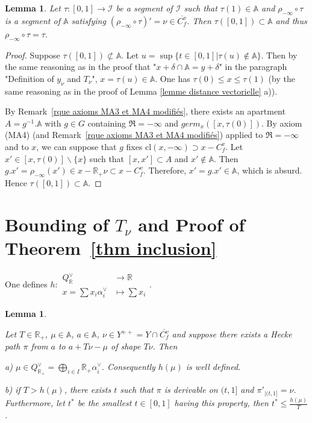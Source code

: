 \documentclass[12pt]{article}
\theoremstyle{plain}
\newtheorem{lemma}[theorem]{Lemma}
\theoremstyle{definition}
\newcommand{\R}{\mathbb{R}}
\newcommand{\A}{\mathbb{A}}
\begin{document}
\begin{lemma}\label{lemme image réciproque de segments}
Let $\tau:[0,1]\rightarrow \mathcal{I}$ be a segment of $\mathcal{I}$ such that $\tau(1)\in \mathbb{A}$ and $\rho_{-\infty}\circ\tau$ is a segment of $\mathbb{A}$ satisfying  $(\rho_{-\infty}\circ\tau)'=\nu\in \overline{C^v_f}$. Then $\tau([0,1])\subset \mathbb{A}$ and thus $\rho_{-\infty}\circ \tau=\tau$.
\end{lemma}

\begin{proof} Suppose $\tau([0,1])\not\subset \A$. Let $u=\sup\{t\in [0,1]|\tau(u)\notin \A\}$. Then by the same reasoning as in the proof that "$x+\delta\cap\A=y+\delta$" in the paragraph "Definition of $y_\nu$ and $T_\nu$", $x=\tau(u)\in\A$. One has $\tau(0)\leq x\leq \tau(1)$ (by the same reasoning as in the proof of Lemma \ref{lemme distance vectorielle} a)). 

By Remark~\ref{rque axioms MA3 et MA4 modifiés}, there exists an apartment $A=g^{-1}.\A$ with $g\in G$ containing $\mathfrak{R}=-\infty$ and $germ_x([x,\tau(0)])$. By axiom (MA4) (and Remark~\ref{rque axioms MA3 et MA4 modifiés}) applied to $\mathfrak{R}=-\infty$ and to $x$, we can suppose that $g$ fixes $\mathrm{cl}(x,-\infty)\supset x-C_f^v$.  
Let $x'\in [x,\tau(0)]\backslash\{x\}$ such that $[x,x']\subset A$ and $x'\notin \A$. Then $g.x'=\rho_{-\infty}(x')\in x-\R_+\nu\subset x-C_f^v$. Therefore, $x'=g.x'\in \A$, which is absurd. Hence $\tau([0,1])\subset \A$.  
\end{proof}




\section{Bounding of $T_\nu$ and Proof of Theorem~\ref{thm inclusion} }\label{sect bounding of T}


One defines $h:\begin{aligned} Q^\vee_{\mathbb{R}}& \rightarrow \mathbb{R}\\
x=\sum x_i\alpha_i^\vee & \mapsto \sum x_i\end{aligned}.$




\begin{lemma}\label{lemme fin des chemins de Hecke longs}


Let $T\in \mathbb{R}_+$, $\mu\in \A$,  $a\in \mathbb{A}$, $\nu\in Y^{++}=Y\cap\overline{C^v_f}$ and suppose there exists a Hecke path $\pi$ from $a$ to $a+T\nu-\mu$ of shape $T\nu$. Then 

a) $\mu\in Q^\vee_{\R_+}=\bigoplus_{i\in I}\R_+\alpha_i^\vee$. Consequently $h(\mu)$ is well defined.

b) if $T>h(\mu)$, there exists $t$ such that $\pi$ is derivable on $(t,1]$ and $\pi'_{|(t,1]}=\nu$. Furthermore, let $t^*$ be the smallest $t \in [0,1]$ having this property, then $t^*\leq \frac{h(\mu)}{T}$.
\end{lemma}
\end{document}
